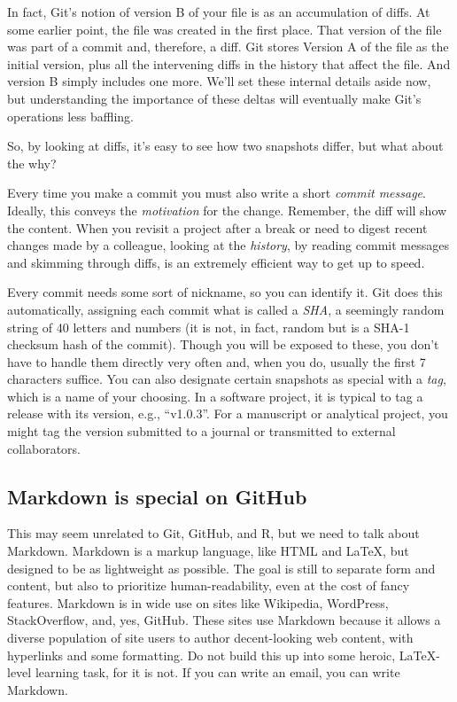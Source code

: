 \documentclass[12pt]{article}
\begin{document}
In fact, Git's notion of version B of your file is as an accumulation of
diffs. At some earlier point, the file was created in the first place.
That version of the file was part of a commit and, therefore, a diff.
Git stores Version A of the file as the initial version, plus all the
intervening diffs in the history that affect the file. And version B
simply includes one more. We'll set these internal details aside now,
but understanding the importance of these deltas will eventually make
Git's operations less baffling.

So, by looking at diffs, it's easy to see how two snapshots differ, but
what about the why?

Every time you make a commit you must also write a short \emph{commit
message}. Ideally, this conveys the \emph{motivation} for the change.
Remember, the diff will show the content. When you revisit a project
after a break or need to digest recent changes made by a colleague,
looking at the \emph{history}, by reading commit messages and skimming
through diffs, is an extremely efficient way to get up to speed.

Every commit needs some sort of nickname, so you can identify it. Git
does this automatically, assigning each commit what is called a
\emph{SHA}, a seemingly random string of 40 letters and numbers (it is
not, in fact, random but is a SHA-1 checksum hash of the commit). Though
you will be exposed to these, you don't have to handle them directly
very often and, when you do, usually the first 7 characters suffice. You
can also designate certain snapshots as special with a \emph{tag}, which
is a name of your choosing. In a software project, it is typical to tag
a release with its version, e.g., ``v1.0.3''. For a manuscript or
analytical project, you might tag the version submitted to a journal or
transmitted to external collaborators.

\subsection{Markdown is special on
GitHub}\label{markdown-is-special-on-github}

This may seem unrelated to Git, GitHub, and R, but we need to talk about
Markdown. Markdown is a markup language, like HTML and LaTeX, but
designed to be as lightweight as possible. The goal is still to separate
form and content, but also to prioritize human-readability, even at the
cost of fancy features. Markdown is in wide use on sites like Wikipedia,
WordPress, StackOverflow, and, yes, GitHub. These sites use Markdown
because it allows a diverse population of site users to author
decent-looking web content, with hyperlinks and some formatting. Do not
build this up into some heroic, LaTeX-level learning task, for it is
not. If you can write an email, you can write Markdown.
\end{document}
